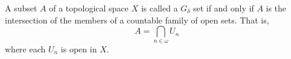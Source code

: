 A subset $A$ of a topological space $X$ is called a $G_\delta$ set if and only if $A$ is the intersection of the members of a countable family of open sets. That is,
$$A = \bigcap_{n \in \omega} U_n$$
where each $U_n$ is open in $X$.
